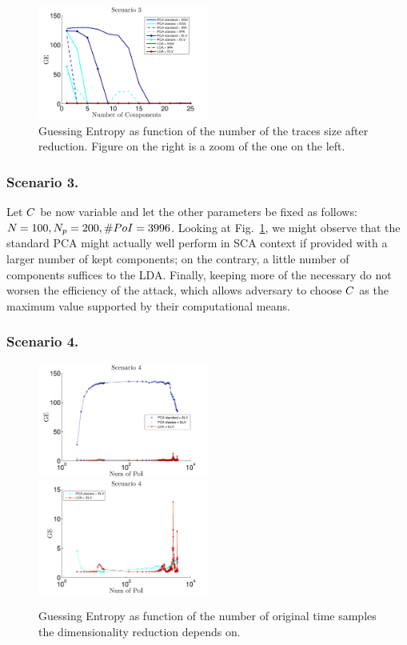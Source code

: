 \begin{figure}
\centering
\includegraphics[width=0.5\textwidth]{figures/Criterion3.pdf}
\caption{Guessing Entropy as function of the number of the traces size after reduction. Figure on the right is a zoom of the one on the left.}\label{fig:3}
\end{figure}

\subsubsection{Scenario 3.}


Let  $\newTraceLength$ be now variable and let the other parameters be fixed as follows: $\numTraces[] = 100, N_p=200, \numPoI = 3996$. Looking at Fig.~\ref{fig:3}, we might observe that the standard PCA might actually well perform in SCA context if provided with a larger number of kept components; on the contrary, a little number of components suffices to the LDA. Finally, keeping more of the necessary do not worsen the efficiency of the attack, which allows adversary to choose $\newTraceLength$ as the maximum value supported by their computational means.



\subsubsection{Scenario 4.}
\begin{figure}
\includegraphics[width=0.5\textwidth]{figures/Criterion4.pdf}
\includegraphics[width=0.5\textwidth]{figures/Criterion4cutted.pdf} 
\caption{Guessing Entropy as function of the number of original time samples the dimensionality reduction depends on.}\label{fig:4}
\end{figure}

